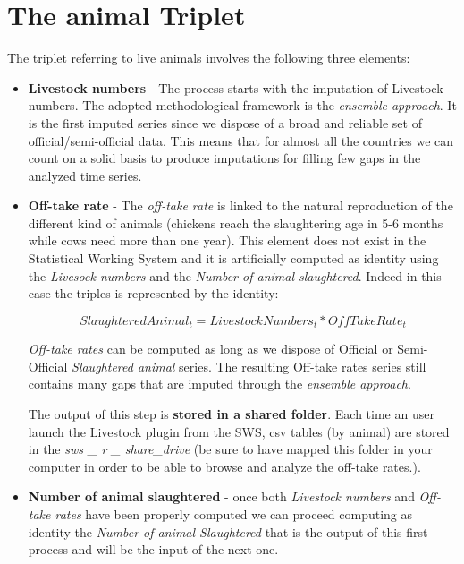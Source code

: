 \documentclass[nojss]{jss}
\begin{document}
 
\section{The animal Triplet}

The triplet referring to live animals involves the following three elements:
\begin{itemize}
\item{\textbf{Livestock numbers} - The process starts with the imputation of Livestock numbers. The adopted methodological framework is the \textit{ensemble approach}. It is the first imputed series since we dispose of a broad and reliable set of official/semi-official data. This means that for almost all the countries we can count on a solid basis to produce imputations for filling few gaps in the analyzed time series.

\begin{center}
\end{center}

}

\item{\textbf{Off-take rate} - The \textit{off-take rate} is linked to the natural reproduction of the different kind of animals (chickens reach the slaughtering age in 5-6 months while cows need more than one year). This element does not exist in the Statistical Working System and it is artificially computed as identity using the \textit{Livesock numbers} and the \textit{Number of animal slaughtered}. Indeed in this case the triples is represented by the identity:

\begin{dmath*}
SlaughteredAnimal_{t}= LivestockNumbers_{t} * OffTakeRate_{t}
\end{dmath*}


\textit{Off-take rates} can be computed as long as we dispose of Official or Semi-Official \textit{Slaughtered animal} series. The resulting Off-take rates series still contains many gaps that are imputed through the \textit{ensemble approach}.

The output of this step is \textbf{stored in a shared folder}. Each time an user launch the Livestock plugin from the SWS, csv tables (by animal) are stored in the \textit{sws _ r _ share_drive} (be sure to have mapped this folder in your computer in order to be able to browse and analyze the off-take rates.).
}




\begin{center}
\end{center}

\item{\textbf{Number of animal slaughtered} - once both \textit{Livestock numbers} and \textit{Off-take rates} have been properly computed we can proceed computing as identity the \textit{Number of animal Slaughtered} that is the output of this first process and will be  the input of the next one.}


\end{itemize}
\end{document}
